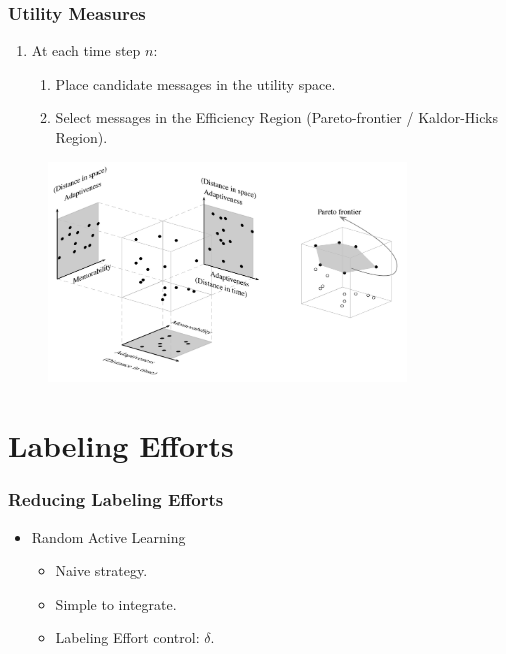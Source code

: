 \documentclass[14pt]{beamer}
\begin{document}
\begin{frame}\frametitle{Utility Measures}

\begin{enumerate}
\item At each time step $n$:
\begin{enumerate}
\item Place candidate messages in the utility space.
\item Select messages in the Efficiency Region (Pareto-frontier / Kaldor-Hicks Region).
\end{enumerate}
\end{enumerate}

\vspace{-0.1in}
\begin{figure}
\centering
\includegraphics[height=2.30in]{pareto}
\end{figure}

\end{frame}

\section{Labeling Efforts}
\begin{frame}\frametitle{Reducing Labeling Efforts}
\begin{itemize}
\item Random Active Learning
\begin{itemize}
\item Naive strategy.
\item Simple to integrate.
\item Labeling Effort control: $\delta$.
\end{itemize}
\end{itemize}
\end{frame}
\end{document}
